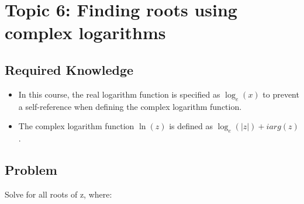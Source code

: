 \documentclass[12pt]{article}
\begin{document}
\section{Topic 6: Finding roots using complex logarithms}
\subsection{Required Knowledge}
\begin{itemize}
    \item In this course, the real logarithm function is specified as $\log_e(x)$ to prevent a self-reference when defining the complex logarithm function.
    \item The complex logarithm function $\ln(z)$ is defined as $\log_e(|z|)+iarg(z)$.
\end{itemize}
\subsection{Problem}
Solve for all roots of z, where:
\end{document}
